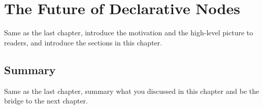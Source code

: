 \chapter{The Future of Declarative Nodes}
\label{cha:futurepart1}
Same as the last chapter, introduce the motivation and the high-level picture to
readers, and introduce the sections in this chapter.




\section{Summary}
Same as the last chapter, summary what you discussed in this chapter and
be the bridge to the next chapter.